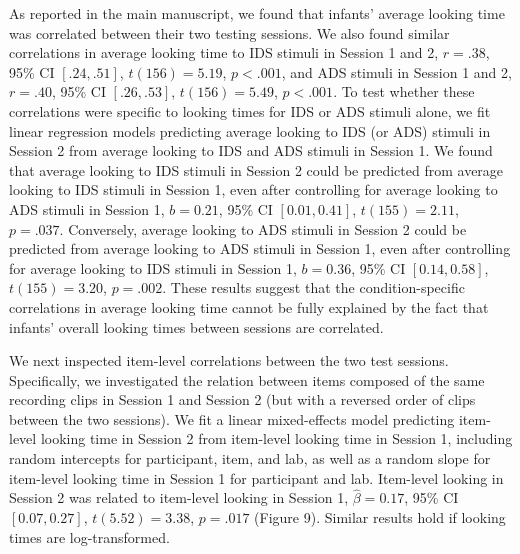 \documentclass[
  english,
  man, donotrepeattitle,floatsintext]{apa6}
\begin{document}
As reported in the main manuscript, we found that infants' average looking time was correlated between their two testing sessions.
We also found similar correlations in average looking time to IDS stimuli in Session 1 and 2, \(r = .38\), 95\% CI \([.24, .51]\), \(t(156) = 5.19\), \(p < .001\), and ADS stimuli in Session 1 and 2, \(r = .40\), 95\% CI \([.26, .53]\), \(t(156) = 5.49\), \(p < .001\).
To test whether these correlations were specific to looking times for IDS or ADS stimuli alone, we fit linear regression models predicting average looking to IDS (or ADS) stimuli in Session 2 from average looking to IDS and ADS stimuli in Session 1.
We found that average looking to IDS stimuli in Session 2 could be predicted from average looking to IDS stimuli in Session 1, even after controlling for average looking to ADS stimuli in Session 1, \(b = 0.21\), 95\% CI \([0.01, 0.41]\), \(t(155) = 2.11\), \(p = .037\).
Conversely, average looking to ADS stimuli in Session 2 could be predicted from average looking to ADS stimuli in Session 1, even after controlling for average looking to IDS stimuli in Session 1, \(b = 0.36\), 95\% CI \([0.14, 0.58]\), \(t(155) = 3.20\), \(p = .002\).
These results suggest that the condition-specific correlations in average looking time cannot be fully explained by the fact that infants' overall looking times between sessions are correlated.

We next inspected item-level correlations between the two test sessions.
Specifically, we investigated the relation between items composed of the same recording clips in Session 1 and Session 2 (but with a reversed order of clips between the two sessions).
We fit a linear mixed-effects model predicting item-level looking time in Session 2 from item-level looking time in Session 1, including random intercepts for participant, item, and lab, as well as a random slope for item-level looking time in Session 1 for participant and lab.
Item-level looking in Session 2 was related to item-level looking in Session 1, \(\hat{\beta} = 0.17\), 95\% CI \([0.07, 0.27]\), \(t(5.52) = 3.38\), \(p = .017\) (Figure 9).
Similar results hold if looking times are log-transformed.
\end{document}
